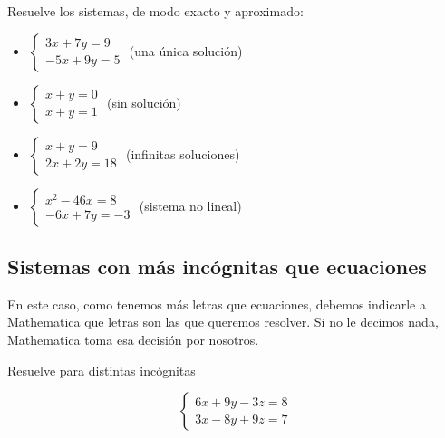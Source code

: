 \documentclass[a4paper,10pt, draft]{article}
\newenvironment{ejer}{\begin{tcolorbox}[center title, title=Ejercicios,
fonttitle=\sffamily\bfseries,colback=blue!5,colframe=orange]}{\end{tcolorbox}}
\begin{document}
\begin{ejer}

Resuelve los sistemas, de modo exacto y aproximado:

\begin{itemize}

\item  $\displaystyle
\begin{cases}
3x+7y=9\\
-5x+9y=5
\end{cases}$ (una única solución)

\item  $\displaystyle
\begin{cases}
x+y=0\\
x+y=1
\end{cases}$ (sin solución)


\item  $\displaystyle
\begin{cases}
x+y=9\\
2x+2y=18
\end{cases}$ (infinitas soluciones)

\item $\displaystyle
\begin{cases}
x^2-46x=8\\
-6x+7y=-3
\end{cases}
$ (sistema no lineal)

\end{itemize}

\end{ejer}  \newpage

\subsection{Sistemas con más incógnitas que ecuaciones}


En este caso, como tenemos más letras que ecuaciones, debemos indicarle a Mathematica que letras son las que queremos resolver. Si no le decimos nada, Mathematica toma esa decisión por nosotros.

\begin{ejer}

Resuelve  para distintas incógnitas

$$
\begin{cases}
6x+9y-3z=8\\
3x-8y+9z=7
\end{cases}
$$


\end{ejer}  \newpage
\end{document}
